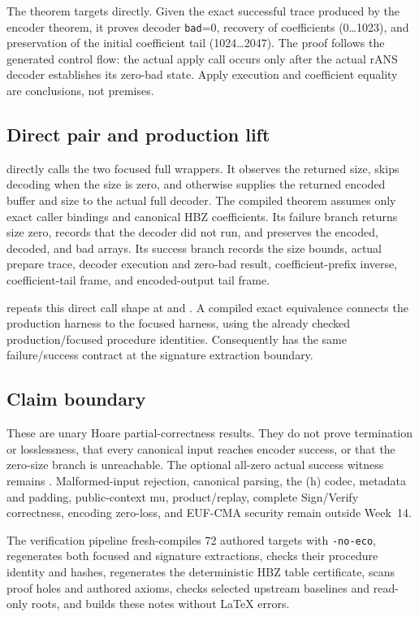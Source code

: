 The theorem  targets
 directly.  Given the exact
successful trace produced by the encoder theorem, it proves decoder
\texttt{bad}=0, recovery of coefficients (0\ldots1023), and preservation of
the initial coefficient tail (1024\ldots2047).  The proof follows the
generated control flow: the actual apply call occurs only after the actual
rANS decoder establishes its zero-bad state.  Apply execution and coefficient
equality are conclusions, not premises.

\subsection*{Direct pair and production lift}

 directly calls the two focused full
wrappers.  It observes the returned size, skips decoding when the size is zero,
and otherwise supplies the returned encoded buffer and size to the actual full
decoder.  The compiled theorem
 assumes only exact
caller bindings and canonical HBZ coefficients.  Its failure branch returns
size zero, records that the decoder did not run, and preserves the encoded,
decoded, and bad arrays.  Its success branch records the size bounds, actual
prepare trace, decoder execution and zero-bad result, coefficient-prefix
inverse, coefficient-tail frame, and encoded-output tail frame.

 repeats this direct call shape at
 and
.  A compiled exact
equivalence connects the production harness to the focused harness, using the
already checked production/focused procedure identities.  Consequently
 has the same
failure/success contract at the signature extraction boundary.

\subsection*{Claim boundary}

These are unary Hoare partial-correctness results.  They do not prove
termination or losslessness, that every canonical input reaches encoder
success, or that the zero-size branch is unreachable.  The optional all-zero
actual success witness remains .  Malformed-input rejection,
canonical parsing, the (h) codec, metadata and padding, public-context mu,
product/replay, complete Sign/Verify correctness, encoding zero-loss, and
EUF-CMA security remain outside Week~14.

The verification pipeline fresh-compiles 72 authored targets with
\texttt{-no-eco}, regenerates both focused and signature extractions, checks
their procedure identity and hashes, regenerates the deterministic HBZ table
certificate, scans proof holes and authored axioms, checks selected upstream
baselines and read-only roots, and builds these notes without LaTeX errors.

